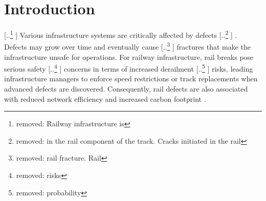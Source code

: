 \documentclass{article}
\providecommand{\DIFadd}[1]{{\protect\color{blue} \sf #1}} %
\providecommand{\DIFdel}[1]{{\protect\color{red} [..\footnote{removed: #1} ]}} %
\providecommand{\DIFaddbegin}{} %
\providecommand{\DIFaddend}{} %
\providecommand{\DIFdelbegin}{} %
\providecommand{\DIFdelend}{} %
\begin{document}
\DIFdelend %


%

\section{Introduction} \label{sec:introduction} %
\DIFdelbegin \DIFdel{Railway infrastructure is }\DIFdelend \DIFaddbegin \DIFadd{Various infrastructure systems are }\DIFaddend critically affected by defects\DIFdelbegin \DIFdel{in the rail component of the track. Cracks initiated in the rail }\DIFdelend \DIFaddbegin \DIFadd{. Defects }\DIFaddend may grow over time and eventually cause \DIFdelbegin \DIFdel{rail fracture.
Rail }\DIFdelend \DIFaddbegin \DIFadd{fractures that make the infrastructure unsafe for operations.
For railway infrastructure, rail }\DIFaddend breaks pose serious safety \DIFdelbegin \DIFdel{risks }\DIFdelend \DIFaddbegin \DIFadd{concerns }\DIFaddend in terms of increased derailment \DIFdelbegin \DIFdel{probability}\DIFdelend \DIFaddbegin \DIFadd{risks}\DIFaddend , leading infrastructure managers to enforce speed restrictions or track replacements when advanced defects are discovered. 
Consequently, rail defects are also associated with reduced network efficiency and increased carbon footprint \citep{cannon2003a,Zoeteman2014DutchBeyond}.  
\end{document}
